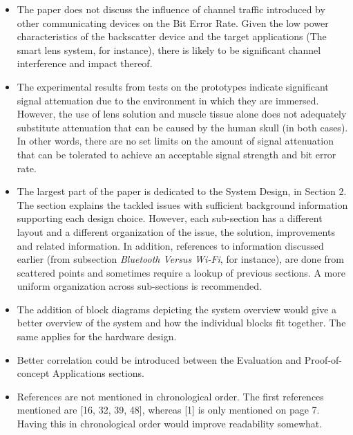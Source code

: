 \documentclass[a4paper]{article}
\begin{document}
\begin{itemize}
\item The paper does not discuss the influence of channel traffic introduced by other communicating devices on the Bit Error Rate. Given the low power characteristics of the backscatter device and the target applications (The smart lens system, for instance), there is likely to be significant channel interference and impact thereof.
\item The experimental results from tests on the prototypes indicate significant signal attenuation due to the environment in which they are immersed. However, the use of lens solution and muscle tissue alone does not adequately substitute attenuation that can be caused by the human skull (in both cases). In other words, there are no set limits on the amount of signal attenuation that can be tolerated to achieve an acceptable signal strength and bit error rate.
\item The largest part of the paper is dedicated to the System Design, in Section 2. The section explains the tackled issues with sufficient background information supporting each design choice. However, each sub-section has a different layout and a different organization of the issue, the solution, improvements and related information. In addition, references to information discussed earlier (from subsection \textit{Bluetooth Versus Wi-Fi}, for instance), are done from scattered points and sometimes require a lookup of previous sections. A more uniform organization across sub-sections is recommended.
\item The addition of block diagrams depicting the system overview would give a better overview of the system and how the individual blocks fit together. The same applies for the hardware design.
\item Better correlation could be introduced between the Evaluation and Proof-of-concept Applications sections.
\item References are not mentioned in chronological order. The first references mentioned are [16, 32, 39, 48], whereas [1] is only mentioned on page 7. Having this in chronological order would improve readability somewhat.
\end{itemize}
\end{document}
